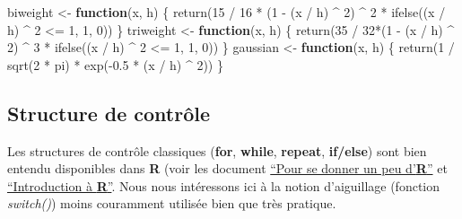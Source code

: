 \documentclass[
]{book}
\newenvironment{Shaded}{\begin{snugshade}}{\end{snugshade}}
\newcommand{\ControlFlowTok}[1]{\textcolor[rgb]{0.13,0.29,0.53}{\textbf{#1}}}
\newcommand{\DecValTok}[1]{\textcolor[rgb]{0.00,0.00,0.81}{#1}}
\newcommand{\FloatTok}[1]{\textcolor[rgb]{0.00,0.00,0.81}{#1}}
\newcommand{\FunctionTok}[1]{\textcolor[rgb]{0.00,0.00,0.00}{#1}}
\newcommand{\NormalTok}[1]{#1}
\newcommand{\OtherTok}[1]{\textcolor[rgb]{0.56,0.35,0.01}{#1}}
\newcommand{\SpecialCharTok}[1]{\textcolor[rgb]{0.00,0.00,0.00}{#1}}
\theoremstyle{definition}
\theoremstyle{definition}
\theoremstyle{definition}
\theoremstyle{definition}
\theoremstyle{remark}
\begin{document}
\begin{Shaded}
\begin{Highlighting}[]
\NormalTok{biweight }\OtherTok{\textless{}{-}} \ControlFlowTok{function}\NormalTok{(x, h) \{}
  \FunctionTok{return}\NormalTok{(}\DecValTok{15} \SpecialCharTok{/} \DecValTok{16} \SpecialCharTok{*}\NormalTok{ (}\DecValTok{1} \SpecialCharTok{{-}}\NormalTok{ (x }\SpecialCharTok{/}\NormalTok{ h) }\SpecialCharTok{\^{}} \DecValTok{2}\NormalTok{) }\SpecialCharTok{\^{}} \DecValTok{2} \SpecialCharTok{*} \FunctionTok{ifelse}\NormalTok{((x }\SpecialCharTok{/}\NormalTok{ h) }\SpecialCharTok{\^{}} \DecValTok{2} \SpecialCharTok{\textless{}=} \DecValTok{1}\NormalTok{, }\DecValTok{1}\NormalTok{, }\DecValTok{0}\NormalTok{))}
\NormalTok{\}}
\NormalTok{triweight }\OtherTok{\textless{}{-}} \ControlFlowTok{function}\NormalTok{(x, h) \{}
  \FunctionTok{return}\NormalTok{(}\DecValTok{35} \SpecialCharTok{/} \DecValTok{32}\SpecialCharTok{*}\NormalTok{(}\DecValTok{1} \SpecialCharTok{{-}}\NormalTok{ (x }\SpecialCharTok{/}\NormalTok{ h) }\SpecialCharTok{\^{}} \DecValTok{2}\NormalTok{) }\SpecialCharTok{\^{}} \DecValTok{3} \SpecialCharTok{*} \FunctionTok{ifelse}\NormalTok{((x }\SpecialCharTok{/}\NormalTok{ h) }\SpecialCharTok{\^{}} \DecValTok{2} \SpecialCharTok{\textless{}=} \DecValTok{1}\NormalTok{, }\DecValTok{1}\NormalTok{, }\DecValTok{0}\NormalTok{))}
\NormalTok{\}}
\NormalTok{gaussian }\OtherTok{\textless{}{-}} \ControlFlowTok{function}\NormalTok{(x, h) \{}
  \FunctionTok{return}\NormalTok{(}\DecValTok{1} \SpecialCharTok{/} \FunctionTok{sqrt}\NormalTok{(}\DecValTok{2} \SpecialCharTok{*}\NormalTok{ pi) }\SpecialCharTok{*} \FunctionTok{exp}\NormalTok{(}\SpecialCharTok{{-}}\FloatTok{0.5} \SpecialCharTok{*}\NormalTok{ (x }\SpecialCharTok{/}\NormalTok{ h) }\SpecialCharTok{\^{}} \DecValTok{2}\NormalTok{))}
\NormalTok{\}}
\end{Highlighting}
\end{Shaded}

\hypertarget{structure-de-contruxf4le}{%
\subsection{Structure de contrôle}\label{structure-de-contruxf4le}}

Les structures de contrôle classiques (\textbf{for}, \textbf{while}, \textbf{repeat}, \textbf{if/else}) sont bien entendu disponibles dans \textbf{R} (voir les document \href{http://math.univ-toulouse.fr/~sdejean}{``Pour se donner un peu d'\textbf{R}''} et \href{http://www.thibault.laurent.free.fr/pedago.html}{``Introduction à \textbf{R}''}. Nous nous intéressons ici à la notion d'aiguillage (fonction \emph{switch()}) moins couramment utilisée bien que très pratique.
\end{document}
